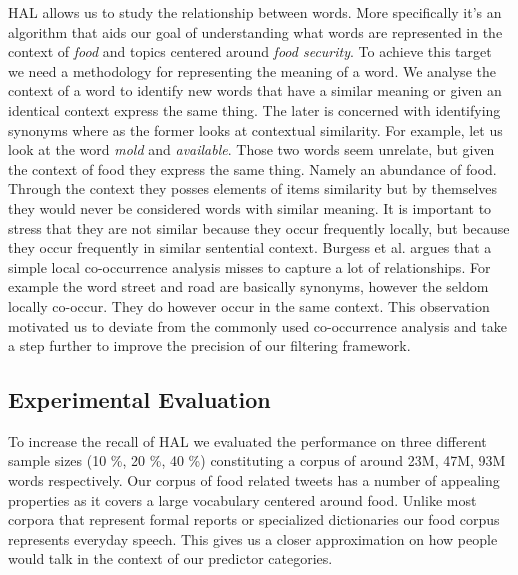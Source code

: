 HAL allows us to study the relationship between words. More specifically it's an algorithm that aids our goal of understanding what words are represented in the context of \emph{food} and topics centered around \emph{food security}. To achieve this target we need a methodology for representing the meaning of a word. We analyse the context of a word to identify new words that have a similar meaning or given an identical context express the same thing. The later is concerned with identifying synonyms where as the former looks at contextual similarity. For example, let us look at the word \emph {mold} and \emph {available}. Those two words seem unrelate, but given the context of food they express the same thing.  Namely an abundance of food. Through the context they posses elements of items similarity but by themselves they would never be considered words with similar meaning. It is important to stress that they are not similar because they occur frequently locally, but because they occur frequently in similar sentential context. Burgess et al. \cite{burgess98} argues that a simple local co-occurrence analysis misses to capture a lot of relationships. For example the word street and road are basically synonyms, however the seldom locally co-occur. They do however occur in the same context. This observation motivated us to deviate from the commonly used co-occurrence analysis and take a step further to improve the precision of our filtering framework. 







 











\subsection{Experimental Evaluation}
\label{sec:exp_eval}

To increase the recall of HAL we evaluated the performance on three different sample sizes (10 \%, 20 \%, 40 \%) constituting a corpus of around 23M, 47M, 93M words respectively. Our corpus of food related tweets has a number of appealing properties as it covers a large vocabulary centered around food. Unlike most corpora that represent formal reports or specialized dictionaries our food corpus represents everyday speech. This gives us a closer approximation on how people would talk in the context of our predictor categories. 

